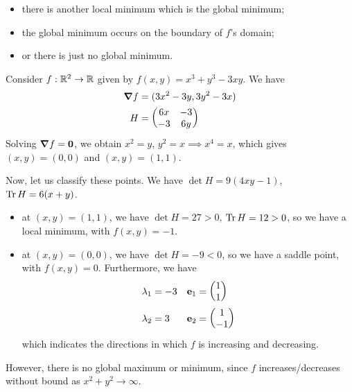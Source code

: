 \documentclass{../template/note}
\begin{document}
    \begin{itemize}
        \item there is another local minimum which is the global minimum;
        \item the global minimum occurs on the boundary of $f$'s domain;
        \item or there is just no global minimum.
    \end{itemize}
    
    \begin{example*}
        Consider $f: \mathbb R^2 \to \mathbb R$ given by $f(x, y) = x^3 + y^3 - 3xy$. We have
        \begin{align*}
            \grad f &= (3x^2 - 3y, 3y^2 - 3x) \\
            H &= \begin{pmatrix}
                6x & -3 \\
                -3 & 6y \\
            \end{pmatrix}
        \end{align*}
        Solving $\grad f = \V 0$, we obtain $x^2 = y$, $y^2 = x \implies x^4 = x$, which gives $(x, y) = (0, 0)$ and $(x, y) = (1, 1)$.

        Now, let us classify these points. We have $\det H = 9(4xy-1)$, $\operatorname{Tr} H = 6(x+y)$.

        \begin{itemize}
            \item at $(x, y) = (1, 1)$, we have $\det H = 27 > 0$, $\operatorname{Tr} H = 12 > 0$, so we have a local minimum, with $f(x, y) = -1$.
            \item at $(x, y) = (0, 0)$, we have $\det H = -9 < 0$, so we have a saddle point, with $f(x, y) = 0$. Furthermore, we have
            \begin{align*}
                \lambda_1 &= -3 && \V e_1 = \begin{pmatrix}
                    1 \\
                    1 \\
                \end{pmatrix} \\
                \lambda_2 &= 3 && \V e_2 = \begin{pmatrix}
                    1 \\
                    -1 \\
                \end{pmatrix}
            \end{align*}
            which indicates the directions in which $f$ is increasing and decreasing.
        \end{itemize}
        However, there is no global maximum or minimum, since $f$ increases/decreases without bound as $x^2+y^2 \to \infty$.
    \end{example*}
    
\end{document}

